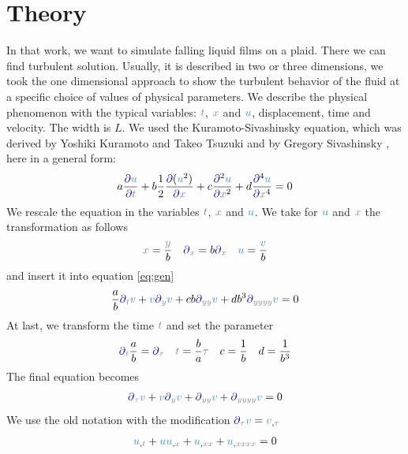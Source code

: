 \documentclass[10pt,fleqn, %
reqno,a4paper]{article}
\makeatletter
\def\mathcolor#1#{\@mathcolor{#1}}
\def\@mathcolor#1#2#3{%
        \protect\leavevmode
        \begingroup\color#1{#2}#3\endgroup
}
\newcommand{\nx}{\mathcolor{gray}{x}}
\newcommand{\ny}{\mathcolor{gray}{y}}
\newcommand{\nt}{\mathcolor{gray}{t}}
\newcommand{\ntau}{\mathcolor{gray}{\tau}}
\newcommand{\nnu}{\mathcolor{cyan!70!black}{u}}
\newcommand{\nnv}{\mathcolor{cyan!70!black}{v}}
\newcommand{\npartial}{\mathcolor{blue!70!black}{\partial}}
\makeatother
\begin{document}
\section{Theory}
In that work, we want to simulate falling liquid films on a plaid. 
There we can find turbulent solution.
Usually, it is described in two or three dimensions, we took the one dimensional approach to show the turbulent behavior of the fluid at a specific choice of values of physical parameters. 
We describe the physical phenomenon with the typical variables: $ \nt $, $ \nx $ and $ \nnu $, displacement, time and velocity. The width is $ L $. We used the Kuramoto-Sivashinsky equation, which was derived by Yoshiki Kuramoto and Takeo Tsuzuki \cite{kuramoto_persistent_1976} and by Gregory Sivashinsky \cite{sivashinsky_nonlinear_1988}, here in a general form: 
\begin{align}
        a\frac{\npartial \nnu}{\npartial \nt} + b\frac{1}{2}\frac{\npartial (\nnu ^2) }{\npartial \nx} +c\frac{\npartial^2 \nnu}{\npartial \nx^2} +d\frac{\npartial^4 \nnu}{\npartial \nx^4} = 0  \label{eq:gen}
\end{align}
We rescale the equation in the variables $ \nt $, $ \nx $ and $ \nnu $.
We take for $ \nnu $ and $ \nx $ the transformation as follows
\begin{align*}
        \nx = \frac{\ny}{b} \quad \npartial_{\nx} = b \npartial_{\nx} \quad \nnu = \frac{\nnv}{b}
\end{align*}
and insert it into equation \eqref{eq:gen}
\begin{align*}
        \frac{a}{b}\npartial_{\nt} \nnv + \nnv \npartial_{\ny} \nnv + cb \npartial_{\ny\ny} \nnv + d b^3 \npartial_{\ny\ny\ny\ny} \nnv = 0 
\end{align*}
At last, we transform the time $ \nt $ and set the parameter
\begin{align*}
        \npartial_{\nt}\frac{a}{b} = \npartial_{\ntau}\quad \nt = \frac{b}{a} \ntau\quad c = \frac{1}{b} \quad d = \frac{1}{b^3}
\end{align*}
The final equation becomes
\begin{align*}
        \npartial_{\ntau} \nnv + \nnv \npartial_{\ny} \nnv +  \npartial_{\ny\ny} \nnv +  \npartial_{\ny\ny\ny\ny} \nnv = 0
\end{align*}
We use the old notation with the modification  $ \npartial_{\ntau} \nnv = \nnv _{,\ntau} $
\begin{align}
        \nnu _{,\nt} + \nnu\nnu_{,\nx} + \nnu_{,\nx\nx} + \nnu_{,\nx\nx\nx\nx} = 0 \label{eq:Kura}
\end{align}
\end{document}
